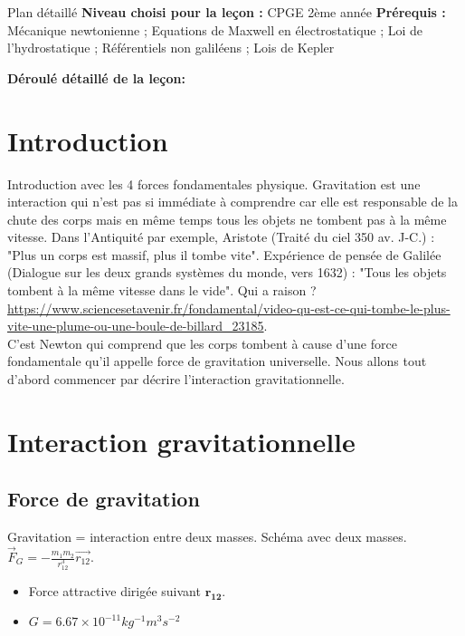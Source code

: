 \begin{reportBlock}{Plan détaillé}
  \textbf{Niveau choisi pour la leçon :} CPGE 2ème année
  \newline
  \textbf{Prérequis : }Mécanique newtonienne ; Equations de Maxwell en électrostatique ; Loi de l'hydrostatique ; Référentiels non galiléens ; Lois de Kepler
  \newline
  
  \textbf{Déroulé détaillé de la leçon: }   \newline
  
  \section*{Introduction}

Introduction avec les 4 forces fondamentales physique. Gravitation est une interaction qui n'est pas si immédiate à comprendre car elle est responsable de la chute des corps mais en même temps tous les objets ne tombent pas à la même vitesse. Dans l'Antiquité par exemple, Aristote (Traité du ciel 350 av. J-C.) : "Plus un corps est massif, plus il tombe vite". Expérience de pensée de Galilée (Dialogue sur les deux grands systèmes du monde, vers 1632) : "Tous les objets tombent à la même vitesse dans le vide". Qui a raison ? \url{https://www.sciencesetavenir.fr/fondamental/video-qu-est-ce-qui-tombe-le-plus-vite-une-plume-ou-une-boule-de-billard_23185}.\\
C'est Newton qui comprend que les corps tombent à cause d'une force fondamentale qu'il appelle force de gravitation universelle. Nous allons tout d'abord commencer par décrire l'interaction gravitationnelle.


\section{Interaction gravitationnelle}

\subsection{Force de gravitation}

Gravitation = interaction entre deux masses. Schéma avec deux masses. $\overrightarrow{F}_G = - \frac{m_1 m_2}{r_{12}^3} \overrightarrow{r_{12}}$. \\
\begin{itemize}
\item Force attractive dirigée suivant $\mathbf{r_{12}}$.
\item $G = 6.67\times10^{-11} kg^{-1} m^3 s^{-2}$
\end{itemize}


\end{reportBlock}
